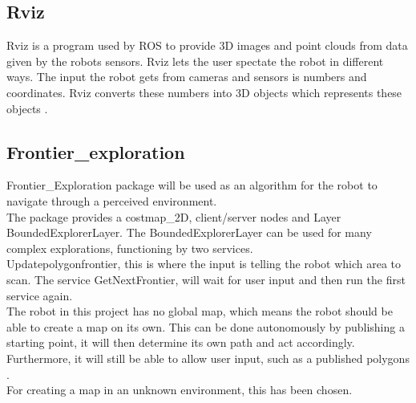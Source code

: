 \subsection{Rviz}
Rviz is a program used by ROS to provide 3D images and point clouds from data given by the robots sensors. Rviz lets the user spectate the robot in different ways. The input the robot gets from cameras and sensors is numbers and coordinates. Rviz converts these numbers into 3D objects which represents these objects \cite{interactiveMarkers}.

\subsection{Frontier\_exploration}
Frontier\_Exploration package will be used as an algorithm for the robot to navigate through a perceived environment.\\
The package provides a costmap\_2D, client/server nodes and Layer BoundedExplorerLayer. The BoundedExplorerLayer can be used for many complex explorations, functioning by two services.\\
Updatepolygonfrontier, this is where the input is telling the robot which area to scan. The service GetNextFrontier, will wait for user input and then run the first service again.\\
The robot in this project has no global map, which means the robot should be able to create a map on its own. This can be done autonomously by publishing a starting point, it will then determine its own path and act accordingly. Furthermore, it will still be able to allow user input, such as a published polygons \cite{ROSexploration}.\\
For creating a map in an unknown environment, this has been chosen.

